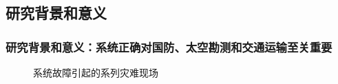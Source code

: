 \documentclass[aspectratio=1610, 9pt, CJK]{beamer}
\begin{document}
	\subsection{研究背景和意义}
	\begin{frame}  
		\frametitle{研究背景和意义：{\footnotesize 系统正确对国防、太空勘测和交通运输至关重要}}
			\begin{figure}
				\setlength{\abovecaptionskip}{0cm}  %
				\setlength{\belowcaptionskip}{-0.2cm} %
				\centering
				\quad
			  \quad
				\caption{系统故障引起的系列灾难现场}
			\end{figure}
		

\end{frame}
\end{document}
